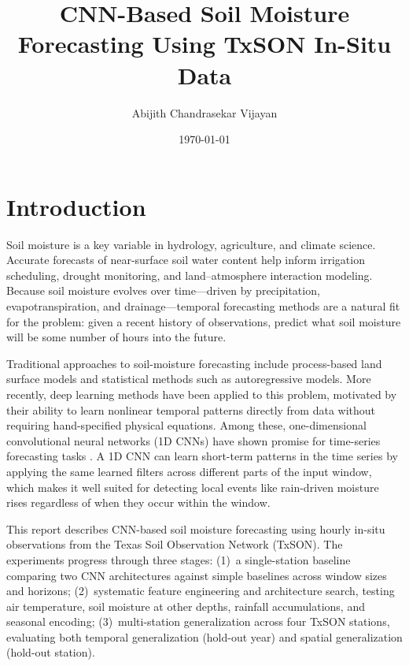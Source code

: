 \documentclass[11pt]{article}
\title{CNN-Based Soil Moisture Forecasting Using TxSON In-Situ Data}
\author{Abijith Chandrasekar Vijayan}
\date{\today}
\begin{document}
\maketitle

\section{Introduction}

Soil moisture is a key variable in hydrology, agriculture, and climate science.
Accurate forecasts of near-surface soil water content help inform irrigation
scheduling, drought monitoring, and land--atmosphere interaction modeling. Because
soil moisture evolves over time---driven by precipitation, evapotranspiration, and
drainage---temporal forecasting methods are a natural fit for the problem: given a
recent history of observations, predict what soil moisture will be some number of
hours into the future.

Traditional approaches to soil-moisture forecasting include process-based land
surface models and statistical methods such as autoregressive models. More recently,
deep learning methods have been applied to this problem, motivated by their ability
to learn nonlinear temporal patterns directly from data without requiring
hand-specified physical equations. Among these, one-dimensional convolutional neural
networks (1D CNNs) have shown promise for time-series forecasting tasks
\cite{borovykh2017conditional, bai2018empirical}. A 1D CNN can learn short-term
patterns in the time series by applying the same learned filters across different
parts of the input window, which makes it well suited for detecting local events
like rain-driven moisture rises regardless of when they occur within the window.

This report describes CNN-based soil moisture forecasting using hourly in-situ
observations from the Texas Soil Observation Network (TxSON). The experiments
progress through three stages: (1)~a single-station baseline comparing two CNN
architectures against simple baselines across window sizes and horizons;
(2)~systematic feature engineering and architecture search, testing air temperature,
soil moisture at other depths, rainfall accumulations, and seasonal encoding;
(3)~multi-station generalization across four TxSON stations, evaluating both temporal
generalization (hold-out year) and spatial generalization (hold-out station).
\end{document}

